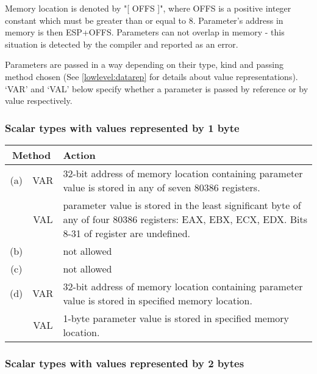    Memory location is denoted by "[ OFFS ]", where OFFS is a positive
   integer constant which must be greater than or equal to 8.
   Parameter's address in memory is then ESP+OFFS.
   Parameters can not overlap in memory - this situation is
   detected by the compiler and reported as an error.

 Parameters are passed in a way depending on their type, kind
 and passing method chosen (See \ref{lowlevel:datarep}
 for details about value representations).
 `VAR' and `VAL' below specify whether a parameter is passed
 by reference or by value respectively.

\subsubsection{Scalar types with values represented by 1 byte}

\begin{tabular}{|c|c|p{8cm}|} \hline
\multicolumn{2}{|c|}{Method} & Action \\ \hline
(a) & VAR & 32-bit address of memory location containing parameter
            value is stored in any of seven 80386 registers.        \\
    & VAL &  parameter value is stored in the least significant
            byte of any of four 80386 registers: EAX, EBX, ECX, EDX.
            Bits 8-31 of register are undefined.                    \\ \hline
(b) && not allowed                                                  \\ \hline
(c) && not allowed                                                  \\ \hline
(d) & VAR & 32-bit address of memory location containing parameter
             value is stored in specified memory location.          \\
    & VAL & 1-byte parameter value is stored in specified memory
            location.                                               \\ \hline
\end{tabular}

\subsubsection{Scalar types with values represented by 2 bytes}

